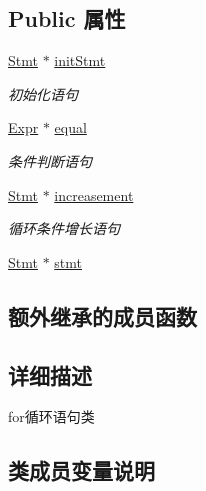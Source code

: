 \subsection*{Public 属性}
\begin{DoxyCompactItemize}
\item 
\hyperlink{class_stmt}{Stmt} $\ast$ \hyperlink{class_for_a056889fe255686012e6a9197c2d514e7}{init\+Stmt}\hypertarget{class_for_a056889fe255686012e6a9197c2d514e7}{}\label{class_for_a056889fe255686012e6a9197c2d514e7}

\begin{DoxyCompactList}\small\item\em 初始化语句 \end{DoxyCompactList}\item 
\hyperlink{class_expr}{Expr} $\ast$ \hyperlink{class_for_a215e09b14cddca31190dc69cd783d886}{equal}\hypertarget{class_for_a215e09b14cddca31190dc69cd783d886}{}\label{class_for_a215e09b14cddca31190dc69cd783d886}

\begin{DoxyCompactList}\small\item\em 条件判断语句 \end{DoxyCompactList}\item 
\hyperlink{class_stmt}{Stmt} $\ast$ \hyperlink{class_for_a2d0ace8af086310ef5a11d9641dc81e6}{increasement}\hypertarget{class_for_a2d0ace8af086310ef5a11d9641dc81e6}{}\label{class_for_a2d0ace8af086310ef5a11d9641dc81e6}

\begin{DoxyCompactList}\small\item\em 循环条件增长语句 \end{DoxyCompactList}\item 
\hyperlink{class_stmt}{Stmt} $\ast$ \hyperlink{class_for_af269abab55eae120cccbd1c76b0c5011}{stmt}
\end{DoxyCompactItemize}
\subsection*{额外继承的成员函数}


\subsection{详细描述}
for循环语句类 

\subsection{类成员变量说明}
